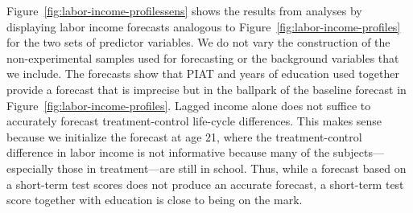 Figure~\ref{fig:labor-income-profilessens} shows the results from analyses by displaying labor income forecasts analogous to Figure~\ref{fig:labor-income-profiles} for the two sets of predictor variables. We do not vary the construction of the non-experimental samples used for forecasting or the background variables that we include. The forecasts show that PIAT and years of education used together provide a forecast that is imprecise but in the ballpark of the baseline forecast in Figure~\ref{fig:labor-income-profiles}. Lagged income alone does not suffice to accurately forecast treatment-control life-cycle differences. This makes sense  because we initialize the forecast at age 21, where the treatment-control difference in labor income is not informative because many of the subjects---especially those in treatment---are still in school. Thus, while a forecast based on a short-term test scores does not produce an accurate forecast, a short-term test score together with education is close to being on the mark.

